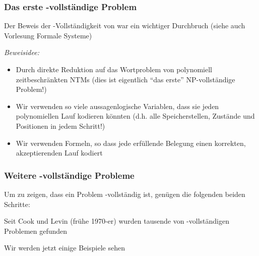 \documentclass[aspectratio=1610,onlymath]{beamer}
\begin{document}
\begin{frame}\frametitle{Das erste -vollständige Problem}

Der Beweis der -Vollständigkeit von  war ein wichtiger Durchbruch (siehe auch Vorlesung Formale Systeme)
\bigskip

\emph{Beweisidee:}
\begin{itemize}
\item Durch direkte Reduktion auf das Wortproblem von polynomiell zeitbeschränkten NTMs
{\tiny(dies ist eigentlich "`das erste"' NP-vollständige Problem!)}
\item Wir verwenden so viele aussagenlogische Variablen, dass sie jeden polynomiellen
Lauf kodieren könnten (d.h. alle Speicherstellen, Zustände und Positionen in jedem Schritt!)
\item Wir verwenden Formeln, so dass jede erfüllende Belegung einen korrekten, akzeptierenden Lauf kodiert
\end{itemize}

\end{frame}

\begin{frame}\frametitle{Weitere -vollständige Probleme}

Um zu zeigen, dass ein Problem  -vollständig ist, genügen 
die folgenden beiden Schritte:\medskip


Seit Cook und Levin (frühe 1970-er) wurden tausende von -vollständigen Problemen gefunden
\bigskip

Wir werden jetzt einige Beispiele sehen

\end{frame}
\end{document}
